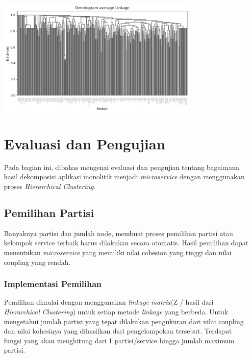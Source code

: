 \begin{center}
	\includegraphics[width=10cm]{img/bab_4/avg_dd.png}
	\label{fig:dd_avg}
\end{center}

\pagebreak


\section{Evaluasi dan Pengujian}
Pada bagian ini, dibahas mengenai evaluasi dan pengujian tentang bagaimana hasil dekomposisi aplikasi monolitik menjadi \textit{microservice} dengan menggunakan proses \textit{Hierarchical Clustering}.

\subsection{Pemilihan Partisi}
Banyaknya partisi dan jumlah node, membuat proses pemilihan partisi atau kelompok service terbaik harus dilakukan secara otomatis. Hasil pemilihan dapat menentukan \textit{microservice} yang memiliki nilai cohesion yang tinggi dan nilai coupling yang rendah.

\subsubsection{Implementasi Pemilihan}
  Pemilihan dimulai dengan menggunakan \textit{linkage} \textit{matrix}(Z / hasil dari \textit{Hierarchical Clustering}) untuk setiap metode \textit{linkage} yang berbeda. Untuk mengetahui jumlah partisi yang tepat dilakukan pengukuran dari nilai coupling dan nilai kohesinya yang dihasilkan dari pengelompokan tersebut. Terdapat fungsi yang akan menghitung dari 1 partisi/service hingga jumlah maximum partisi.

